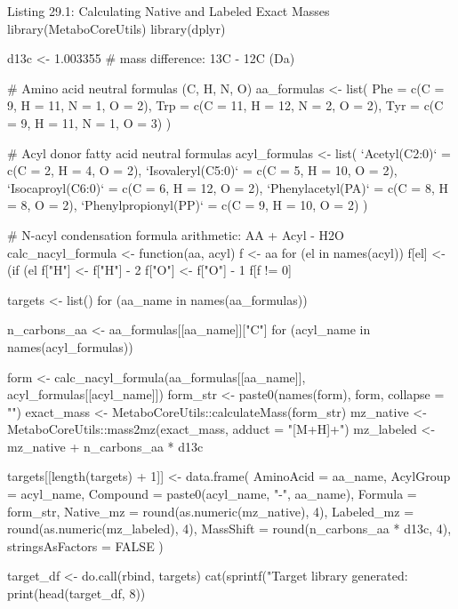 \documentclass[11pt,twoside,openright]{book}
\begin{document}
\begin{rchunk}{Listing 29.1: Calculating Native and Labeled Exact Masses}
library(MetaboCoreUtils)
library(dplyr)

d13c <- 1.003355   # mass difference: 13C - 12C (Da)

# Amino acid neutral formulas (C, H, N, O)
aa_formulas <- list(
  Phe = c(C = 9,  H = 11, N = 1, O = 2),
  Trp = c(C = 11, H = 12, N = 2, O = 2),
  Tyr = c(C = 9,  H = 11, N = 1, O = 3)
)

# Acyl donor fatty acid neutral formulas
acyl_formulas <- list(
  `Acetyl(C2:0)`        = c(C = 2, H = 4,  O = 2),
  `Isovaleryl(C5:0)`    = c(C = 5, H = 10, O = 2),
  `Isocaproyl(C6:0)`    = c(C = 6, H = 12, O = 2),
  `Phenylacetyl(PA)`    = c(C = 8, H = 8,  O = 2),
  `Phenylpropionyl(PP)` = c(C = 9, H = 10, O = 2)
)

# N-acyl condensation formula arithmetic: AA + Acyl - H2O
calc_nacyl_formula <- function(aa, acyl) {
  f <- aa
  for (el in names(acyl)) {
    f[el] <- (if (el %
  }
  f["H"] <- f["H"] - 2
  f["O"] <- f["O"] - 1
  f[f != 0]
}

targets <- list()
for (aa_name in names(aa_formulas)) {
  n_carbons_aa <- aa_formulas[[aa_name]]["C"]
  for (acyl_name in names(acyl_formulas)) {
    form <- calc_nacyl_formula(aa_formulas[[aa_name]], acyl_formulas[[acyl_name]])
    form_str <- paste0(names(form), form, collapse = "")
    exact_mass <- MetaboCoreUtils::calculateMass(form_str)
    mz_native  <- MetaboCoreUtils::mass2mz(exact_mass, adduct = "[M+H]+")
    mz_labeled <- mz_native + n_carbons_aa * d13c
    
    targets[[length(targets) + 1]] <- data.frame(
      AminoAcid    = aa_name,
      AcylGroup    = acyl_name,
      Compound     = paste0(acyl_name, "-", aa_name),
      Formula      = form_str,
      Native_mz    = round(as.numeric(mz_native), 4),
      Labeled_mz   = round(as.numeric(mz_labeled), 4),
      MassShift    = round(n_carbons_aa * d13c, 4),
      stringsAsFactors = FALSE
    )
  }
}
target_df <- do.call(rbind, targets)
cat(sprintf("Target library generated: %
print(head(target_df, 8))
\end{rchunk}
\end{document}
